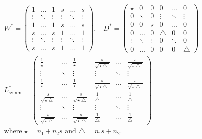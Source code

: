 \begin{equation}
\begin{gathered}
  W^* = \left(
  \begin{array}{cccccc}
    1 & \hdots & 1 & s & \hdots & s \\
    \vdots & \ddots & \vdots & \vdots & \ddots & \vdots \\
    1 & \hdots & 1 & s & \hdots & s \\
   s & \hdots & s & 1 & \hdots & 1 \\
    \vdots & \ddots & \vdots & \vdots & \ddots & \vdots \\
    s & \hdots & s & 1 & \hdots & 1 
  \end{array} \right) , \quad 
%
 D^* = \left(
  \begin{array}{cccccc}
    \star & 0 & 0 & 0 & \hdots & 0 \\
    0 & \ddots & 0 & \vdots & \ddots & \vdots \\
    0 & 0 & \star & 0 & \hdots & 0 \\
   0 & \hdots & 0 & \bigtriangleup & 0 & 0 \\
    \vdots & \ddots & \vdots & 0 & \ddots & 0 \\
    0 & \hdots & 0 & 0 & 0 & \bigtriangleup 
  \end{array} \right) \\
%
 L_{\text{symm}}^* = \left(
  \begin{array}{cccccc}
    \frac{1}{\star} & \hdots & \frac{1}{\star} & \frac{s}{\sqrt{\star \bigtriangleup}} & \hdots & \frac{s}{\sqrt{\star \bigtriangleup}} \\
    \vdots & \ddots & \vdots & \vdots & \ddots & \vdots \\
    \frac{1}{\star} & \hdots & \frac{1}{\star} & \frac{s}{\sqrt{\star \bigtriangleup}} & \hdots & \frac{s}{\sqrt{\star \bigtriangleup}} \\
   \frac{s}{\sqrt{\star \bigtriangleup}} & \hdots & \frac{s}{\sqrt{\star \bigtriangleup}} & \frac{1}{\bigtriangleup}  & \hdots &  \frac{1}{\bigtriangleup} \\
    \vdots & \ddots & \vdots & \vdots & \ddots & \vdots \\
    \frac{s}{\sqrt{\star \bigtriangleup}} & \hdots & \frac{s}{\sqrt{\star \bigtriangleup}} & \frac{1}{\bigtriangleup}  & \hdots &  \frac{1}{\bigtriangleup} 
  \end{array} \right) 
\\
\text{where } \star = n_1 + n_2s \text{ and } \bigtriangleup = n_1s + n_2. 
\end{gathered} \label{eq:example_repeated}
\end{equation}

